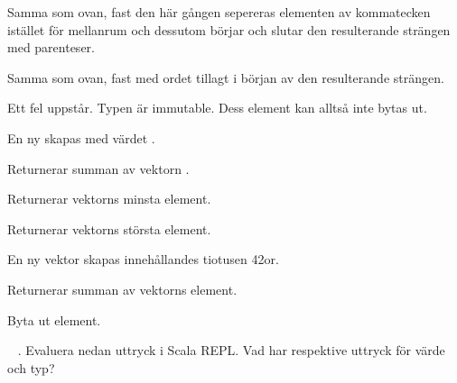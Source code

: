 \SubtaskSolved  Samma som ovan, fast den här gången sepereras elementen av kommatecken istället för mellanrum och dessutom börjar och slutar den resulterande strängen med parenteser.

\SubtaskSolved  Samma som ovan, fast med ordet  tillagt i början av den resulterande strängen.

\SubtaskSolved  Ett fel uppstår. Typen  är immutable. Dess element kan alltså inte bytas ut.

\SubtaskSolved  En ny  skapas med värdet .

\SubtaskSolved  Returnerar summan av vektorn .

\SubtaskSolved  Returnerar vektorns minsta element.

\SubtaskSolved  Returnerar vektorns största element.

\SubtaskSolved  En ny vektor skapas innehållandes tiotusen 42or.

\SubtaskSolved  Returnerar summan av vektorns element.

\SubtaskSolved  Byta ut element.



\QUESTEND









\QUESTBEGIN

\Task  \what~ . Evaluera nedan uttryck i Scala REPL. Vad har respektive uttryck för värde och typ?

\Subtask {}

\Subtask {}

\Subtask {}

\Subtask {}

\Subtask {}

\Subtask {}

\Subtask {}

\Subtask {}


\SOLUTION


\TaskSolved \what


